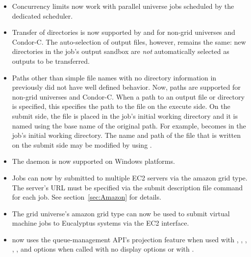 \begin{itemize}

\item Concurrency limits now work with parallel universe jobs
scheduled by the dedicated scheduler.

\item Transfer of directories is now supported by
   and
   for non-grid universes and
  Condor-C.  The auto-selection of output files, however, remains the
  same: new directories in the job's output sandbox are \emph{not}
  automatically selected as outputs to be transferred.

\item Paths other than simple file names with no directory information
  in  previously did not have well
  defined behavior.  Now, paths are supported for non-grid universes
  and Condor-C.  When a path to an output file or directory is
  specified, this specifies the path to the file on the execute side.
  On the submit side, the file is placed in the job's initial working
  directory and it is named using the base name of the original path.
  For example,  becomes 
  in the job's initial working directory.  The name and path of the
  file that is written on the submit side may be modified by using
  .

\item The  daemon is now supported on Windows platforms.

\item Jobs can now by submitted to multiple EC2 servers via the amazon
grid type. The server's URL must be specified via the 
submit description file command for each job.
See section~\ref{sec:Amazon} for details.

\item The grid universe's amazon grid type can now be used to submit
virtual machine jobs to Eucalyptus systems via the EC2 interface.

\item {} now uses the queue-management API's projection feature when 
  used with , , , , 
  , and  options when called with no display options
  or with . 


\end{itemize}
